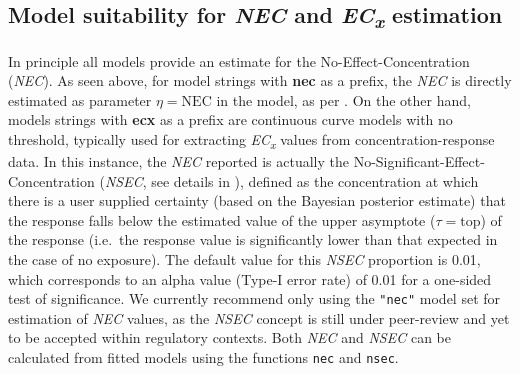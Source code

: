 \documentclass[
  shortnames]{jss}
\begin{document}
\subsection[Model suitability for NEC and ECx estimation]{Model suitability for \textit{NEC} and \textit{EC\textsubscript{x}} estimation}\label{modsuit}

In principle all models provide an estimate for the No-Effect-Concentration (\emph{NEC}). As seen above, for model strings with \textbf{nec} as a prefix, the \emph{NEC} is directly estimated as parameter \(\eta = \text{NEC}\) in the model, as per \citep{Fox2010}. On the other hand, models strings with \textbf{ecx} as a prefix are continuous curve models with no threshold, typically used for extracting \emph{EC\textsubscript{x}} values from concentration-response data. In this instance, the \emph{NEC} reported is actually the No-Significant-Effect-Concentration (\emph{NSEC}, see details in \citet{Fisher2022}), defined as the concentration at which there is a user supplied certainty (based on the Bayesian posterior estimate) that the response falls below the estimated value of the upper asymptote (\(\tau = \text{top}\)) of the response (i.e.~the response value is significantly lower than that expected in the case of no exposure). The default value for this \emph{NSEC} proportion is 0.01, which corresponds to an alpha value (Type-I error rate) of 0.01 for a one-sided test of significance. We currently recommend only using the \texttt{"nec"} model set for estimation of \emph{NEC} values, as the \emph{NSEC} concept is still under peer-review and yet to be accepted within regulatory contexts. Both \emph{NEC} and \emph{NSEC} can be calculated from fitted models using the functions \texttt{nec} and \texttt{nsec}.
\end{document}
